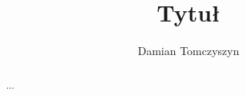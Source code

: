 \documentclass[]{article}
\title{Tytuł}
\author{Damian Tomczyszyn}
\begin{document}
\maketitle

\begin{abstract}
...
\end{abstract}

\section{}
\end{document}
